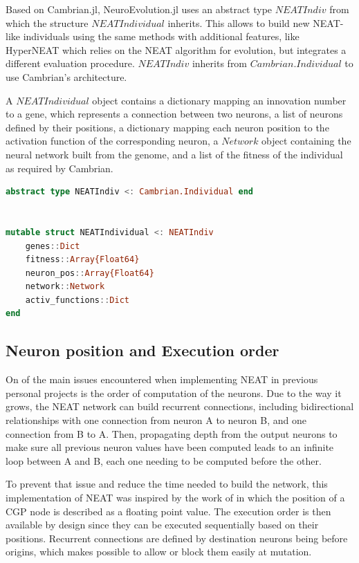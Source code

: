 Based on Cambrian.jl, NeuroEvolution.jl uses an abstract type $NEATIndiv$ from which the structure $NEATIndividual$ inherits. This allows to build new NEAT-like individuals using the same methods with additional features, like HyperNEAT which relies on the NEAT algorithm for evolution, but integrates a different evaluation procedure. $NEATIndiv$ inherits from $Cambrian.Individual$ to use Cambrian's architecture.

A $NEATIndividual$ object contains a dictionary mapping an innovation number to a gene, which represents a connection between two neurons, a list of neurons defined by their positions, a dictionary mapping each neuron position to the activation function of the corresponding neuron, a $Network$ object containing the neural network built from the genome, and a list of the fitness of the individual as required by Cambrian.

\begin{lstlisting}[language=Julia, caption=NEAT Individual (\href{https://github.com/TemplierPaul/NeuroEvolution.jl/blob/master/src/individual.jl}{\color{blue}{Source}})]
abstract type NEATIndiv <: Cambrian.Individual end


mutable struct NEATIndividual <: NEATIndiv
    genes::Dict
    fitness::Array{Float64}
    neuron_pos::Array{Float64}
    network::Network
    activ_functions::Dict
end
\end{lstlisting}

\subsection{Neuron position and Execution order}
\label{subsec:NEAT_neur_pos}

On of the main issues encountered when implementing NEAT in previous personal projects is the order of computation of the neurons. Due to the way it grows, the NEAT network can build recurrent connections, including bidirectional relationships with one connection from neuron A to neuron B, and one connection from B to A. Then, propagating depth from the output neurons to make sure all previous neuron values have been computed leads to an infinite loop between A and B, each one needing to be computed before the other. 

To prevent that issue and reduce the time needed to build the network, this implementation of NEAT was inspired by the work of \cite{wilson2018positionalcgp} in which the position of a CGP node is described as a floating point value. The execution order is then available by design since they can be executed sequentially based on their positions. Recurrent connections are defined by destination neurons being before origins, which makes possible to allow or block them easily at mutation. 

